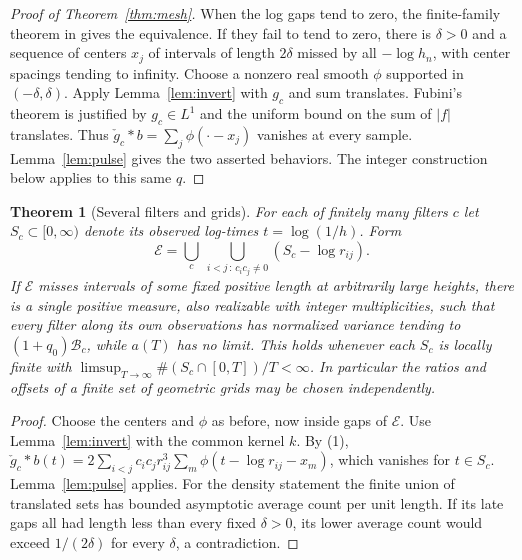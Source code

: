 \documentclass[11pt,letterpaper]{article}
\newtheorem{theorem}{Theorem}[section]
\theoremstyle{definition}
\newcommand{\BB}{\mathcal B}
\begin{document}
\begin{proof}[Proof of Theorem~\ref{thm:mesh}]
When the log gaps tend to zero, the finite-family theorem in \cite{four} gives the equivalence. If they fail to tend to zero, there is $\delta>0$ and a sequence of centers $x_j$ of intervals of length $2\delta$ missed by all $-\log h_n$, with center spacings tending to infinity. Choose a nonzero real smooth $\phi$ supported in $(-\delta,\delta)$. Apply Lemma~\ref{lem:invert} with $g_c$ and sum translates. Fubini's theorem is justified by $g_c\in L^1$ and the uniform bound on the sum of $|f|$ translates. Thus $\check g_c*b=\sum_j\phi(\cdot-x_j)$ vanishes at every sample. Lemma~\ref{lem:pulse} gives the two asserted behaviors. The integer construction below applies to this same $q$.
\end{proof}

\begin{theorem}[Several filters and grids]\label{thm:bankmesh}
For each of finitely many filters $c$ let $S_c\subset[0,\infty)$ denote its observed log-times $t=\log(1/h)$. Form
\[
 \mathcal E=\bigcup_c\ \bigcup_{i<j\, :\,c_ic_j\ne0}
 (S_c-\log r_{ij}).
\]
If $\mathcal E$ misses intervals of some fixed positive length at arbitrarily large heights, there is a single positive measure, also realizable with integer multiplicities, such that every filter along its own observations has normalized variance tending to $(1+q_0)\BB_c$, while $a(T)$ has no limit. This holds whenever each $S_c$ is locally finite with $\limsup_{T\to\infty}\#(S_c\cap[0,T])/T<\infty$. In particular the ratios and offsets of a finite set of geometric grids may be chosen independently.
\end{theorem}
\begin{proof}
Choose the centers and $\phi$ as before, now inside gaps of $\mathcal E$. Use Lemma~\ref{lem:invert} with the common kernel $k$. By (1),
$\check g_c*b(t)=2\sum_{i<j}c_ic_jr_{ij}^3\sum_m\phi(t-\log r_{ij}-x_m)$,
which vanishes for $t\in S_c$. Lemma~\ref{lem:pulse} applies. For the density statement the finite union of translated sets has bounded asymptotic average count per unit length. If its late gaps all had length less than every fixed $\delta>0$, its lower average count would exceed $1/(2\delta)$ for every $\delta$, a contradiction.
\end{proof}
\end{document}
